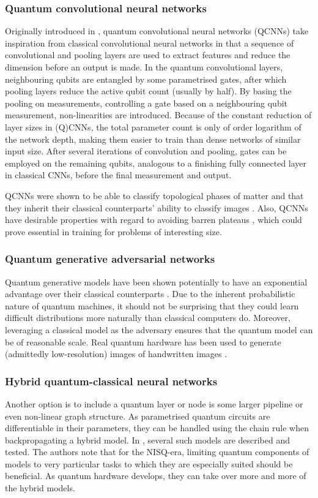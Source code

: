 \subsubsection{Quantum convolutional neural networks}
\label{sec:qcnn}
Originally introduced in \cite{cong2019}, quantum convolutional neural networks (QCNNs) take inspiration from classical convolutional neural networks in that a sequence of convolutional and pooling layers are used to extract features and reduce the dimension before an output is made.
In the quantum convolutional layers, neighbouring qubits are entangled by some parametrised gates, after which pooling layers reduce the active qubit count (usually by half).
By basing the pooling on measurements, controlling a gate based on a neighbouring qubit measurement, non-linearities are introduced.
Because of the constant reduction of layer sizes in (Q)CNNs, the total parameter count is only of order logarithm of the network depth, making them easier to train than dense networks of similar input size.
After several iterations of convolution and pooling, gates can be employed on the remaining qubits, analogous to a finishing fully connected layer in classical CNNs, before the final
measurement and output.

QCNNs were shown to be able to classify topological phases of matter \cite{cong2019} and that they inherit their classical counterparts' ability to classify images \cite{oh2020}.
Also, QCNNs have desirable properties with regard to avoiding barren plateaus \cite{pesah2021}, which could prove essential in training for problems of interesting size.

\subsubsection{Quantum generative adversarial networks}
Quantum generative models have been shown potentially to have an exponential advantage over their classical counterparts \cite{gao2018}.
Due to the inherent probabilistic nature of quantum machines, it should not be surprising that they could learn difficult distributions more naturally than classical computers do.
Moreover, leveraging a classical model as the adversary ensures that the quantum model can be of reasonable scale.
Real quantum hardware has been used to generate (admittedly low-resolution) images of handwritten images \cite{huang2021}.

\subsubsection{Hybrid quantum-classical neural networks}
Another option is to include a quantum layer or node is some larger pipeline or even non-linear graph structure.
As parametrised quantum circuits are differentiable in their parameters, they can be handled using the chain rule when backpropagating a hybrid model.
In \cite{killoran2019}, several such models are described and tested.
The authors note that for the NISQ-era, limiting quantum components of models to very particular tasks to which they are especially suited should be beneficial.
As quantum hardware develops, they can take over more and more of the hybrid models.


